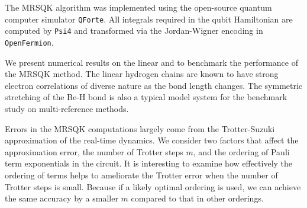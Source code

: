 \documentclass[journal=jctcce,manuscript=article]{achemso}
\newcommand{\methodabbr}[0]{MRSQK\xspace}
\begin{document}
The \methodabbr algorithm was implemented using the open-source quantum computer simulator \texttt{QForte}.\cite{Evangelista2019QForte}
All integrals required in the qubit Hamiltonian are computed by \texttt{Psi4}\cite{Parrish:2017hg} and transformed via the Jordan-Wigner encoding in \texttt{OpenFermion}.\cite{McClean:2017tj}

We present numerical results on the linear  and  to benchmark the performance of the \methodabbr method.
The linear hydrogen chains are known to have strong electron correlations of diverse nature as the bond length changes.\cite{Sinitskiy2010StrongCorrelation,  stella2011strong, Motta2017TowardsThe, Motta:2019ts} 
The symmetric stretching of the Be-H bond is also a typical model system for the benchmark study on multi-reference methods.  
 
Errors in the \methodabbr computations largely come from the Trotter-Suzuki approximation of the real-time dynamics. 
We consider two factors that affect the approximation error, the number of Trotter steps $m$, and the ordering of Pauli term exponentials in the circuit. 
It is interesting to examine how effectively the ordering of terms helps to ameliorate the Trotter error when the number of Trotter steps is small. Because if a likely optimal ordering is used, we can achieve the same accuracy by a smaller $m$ compared to that in other orderings.
\end{document}

